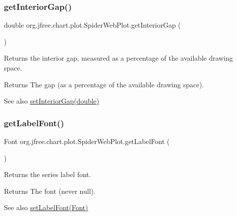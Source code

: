 \subsubsection{\texorpdfstring{get\+Interior\+Gap()}{getInteriorGap()}}
{\footnotesize\ttfamily double org.\+jfree.\+chart.\+plot.\+Spider\+Web\+Plot.\+get\+Interior\+Gap (\begin{DoxyParamCaption}{ }\end{DoxyParamCaption})}

Returns the interior gap, measured as a percentage of the available drawing space.

\begin{DoxyReturn}{Returns}
The gap (as a percentage of the available drawing space).
\end{DoxyReturn}
\begin{DoxySeeAlso}{See also}
\mbox{\hyperlink{classorg_1_1jfree_1_1chart_1_1plot_1_1_spider_web_plot_aa1d77acd75dcfc16982750d3ec686a67}{set\+Interior\+Gap(double)}} 
\end{DoxySeeAlso}
\mbox{\label{classorg_1_1jfree_1_1chart_1_1plot_1_1_spider_web_plot_a5993272d93bc89f903ef3f4a0fbc8bc7}} 
\subsubsection{\texorpdfstring{get\+Label\+Font()}{getLabelFont()}}
{\footnotesize\ttfamily Font org.\+jfree.\+chart.\+plot.\+Spider\+Web\+Plot.\+get\+Label\+Font (\begin{DoxyParamCaption}{ }\end{DoxyParamCaption})}

Returns the series label font.

\begin{DoxyReturn}{Returns}
The font (never {\ttfamily null}).
\end{DoxyReturn}
\begin{DoxySeeAlso}{See also}
\mbox{\hyperlink{classorg_1_1jfree_1_1chart_1_1plot_1_1_spider_web_plot_aba780c8190d9f3467f5ade6e0735fe50}{set\+Label\+Font(\+Font)}} 
\end{DoxySeeAlso}
\mbox{\label{classorg_1_1jfree_1_1chart_1_1plot_1_1_spider_web_plot_a489c44a3be5faba2861730381c3b769e}} 
